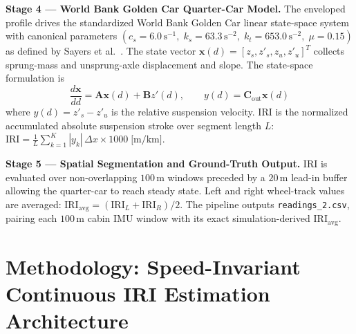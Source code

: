 \documentclass[conference]{IEEEtran}
\begin{document}
\textbf{Stage 4 — World Bank Golden Car Quarter-Car Model.}
The enveloped profile drives the standardized World Bank Golden Car linear state-space system with canonical parameters $(c_s = 6.0\,\text{s}^{-1},\; k_s = 63.3\,\text{s}^{-2},\; k_t = 653.0\,\text{s}^{-2},\; \mu = 0.15)$ as defined by Sayers et al.~\cite{3}. The state vector $\mathbf{x}(d) = [z_s, z'_s, z_u, z'_u]^T$ collects sprung-mass and unsprung-axle displacement and slope. The state-space formulation is
\begin{equation}
\frac{d\mathbf{x}}{dd} = \mathbf{A}\mathbf{x}(d) + \mathbf{B}z'(d), \qquad y(d) = \mathbf{C}_{\text{out}}\mathbf{x}(d)
\end{equation}
where $y(d) = z'_s - z'_u$ is the relative suspension velocity. IRI is the normalized accumulated absolute suspension stroke over segment length $L$:
$\text{IRI} = \tfrac{1}{L}\sum_{k=1}^{K}|y_k|\,\Delta x \times 1000\;\text{[m/km]}$.

\textbf{Stage 5 — Spatial Segmentation and Ground-Truth Output.}
IRI is evaluated over non-overlapping $100\,\text{m}$ windows preceded by a $20\,\text{m}$ lead-in buffer allowing the quarter-car to reach steady state. Left and right wheel-track values are averaged: $\text{IRI}_{\text{avg}} = (\text{IRI}_L + \text{IRI}_R)/2$. The pipeline outputs \texttt{readings\_2.csv}, pairing each $100\,\text{m}$ cabin IMU window with its exact simulation-derived $\text{IRI}_{\text{avg}}$.

\section{Methodology: Speed-Invariant Continuous IRI Estimation Architecture}
\end{document}
